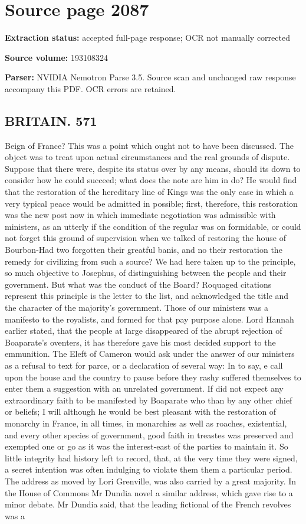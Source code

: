 \clearpage
\section{Source page 2087}
\textbf{Extraction status:} accepted full-page response; OCR not manually corrected\par
\textbf{Source volume:} 193108324\par
\textbf{Parser:} NVIDIA Nemotron Parse 3.5. Source scan and unchanged raw response accompany this PDF. OCR errors are retained.\par\medskip
\subsection*{BRITAIN. 571}
Beign of France? This was a point which ought not to have been discussed. The object was to treat upon actual circumstances and the real grounds of dispute. Suppose that there were, despite its status over by any means, should its down to consider how he could succeed; what does the note are him in do? He would find that the restoration of the hereditary line of Kings was the only case in which a very typical peace would be admitted in possible; first, therefore, this restoration was the new post now in which immediate negotiation was admissible with ministers, as an utterly if the condition of the regular was on formidable, or could not forget this ground of supervision when we talked of restoring the house of Bourbon-Had two forgotten their greatful banis, and no their restoration the remedy for civilizing from such a source? We had here taken up to the principle, so much objective to Josephus, of distinguishing between the people and their government. But what was the conduct of the Board? Roquaged citations represent this principle is the letter to the list, and acknowledged the title and the character of the majority’s government. Those of our ministers was a manifesto to the royalists, and formed for that pay purpose alone. Lord Hannah earlier stated, that the people at large disappeared of the abrupt rejection of Boaparate's oventers, it has therefore gave his most decided support to the emmunition. The Eleft of Cameron would ask under the answer of our ministers as a refusal to text for parce, or a declaration of several way: In to say, e call upon the house and the country to pause before they rashy suffered themselves to enter them a suggestion with an unrelated government. If did not expect any extraordinary faith to be manifested by Boaparate who than by any other chief or beliefs; I will although he would be best pleasant with the restoration of monarchy in France, in all times, in monarchies as well as roaches, existential, and every other species of government, good faith in treastes was preserved and exempted one or go as it was the interest-east of the parties to maintain it. So little integrity had history left to record, that, at the very time they were signed, a secret intention was often indulging to violate them them a particular period. The address as moved by Lori Grenville, was also carried by a great majority. In the House of Commons Mr Dundia novel a similar address, which gave rise to a minor debate. Mr Dundia said, that the leading fictional of the French revolves was a 